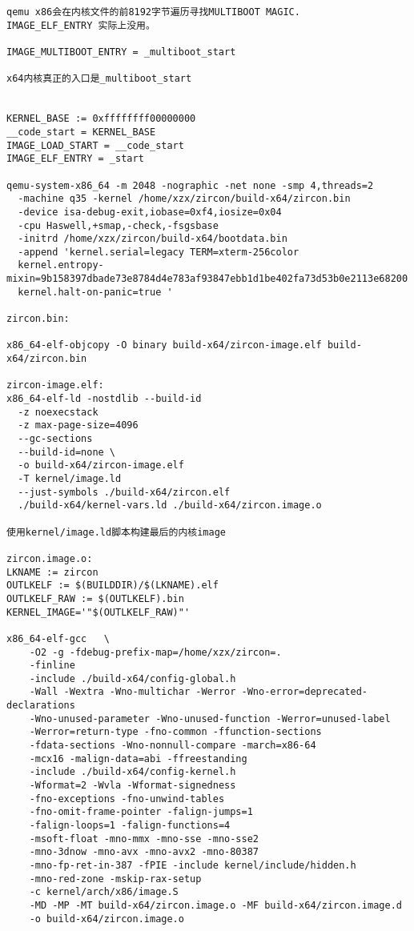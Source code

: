 \begin{verbatim}
qemu x86会在内核文件的前8192字节遍历寻找MULTIBOOT MAGIC.  
IMAGE_ELF_ENTRY 实际上没用。

IMAGE_MULTIBOOT_ENTRY = _multiboot_start

x64内核真正的入口是_multiboot_start


KERNEL_BASE := 0xffffffff00000000
__code_start = KERNEL_BASE
IMAGE_LOAD_START = __code_start
IMAGE_ELF_ENTRY = _start

qemu-system-x86_64 -m 2048 -nographic -net none -smp 4,threads=2 
  -machine q35 -kernel /home/xzx/zircon/build-x64/zircon.bin 
  -device isa-debug-exit,iobase=0xf4,iosize=0x04 
  -cpu Haswell,+smap,-check,-fsgsbase 
  -initrd /home/xzx/zircon/build-x64/bootdata.bin 
  -append 'kernel.serial=legacy TERM=xterm-256color 
  kernel.entropy-mixin=9b158397dbade73e8784d4e783af93847ebb1d1be402fa73d53b0e2113e68200 
  kernel.halt-on-panic=true '

zircon.bin:

x86_64-elf-objcopy -O binary build-x64/zircon-image.elf build-x64/zircon.bin

zircon-image.elf:
x86_64-elf-ld -nostdlib --build-id 
  -z noexecstack 
  -z max-page-size=4096 
  --gc-sections 
  --build-id=none \
  -o build-x64/zircon-image.elf 
  -T kernel/image.ld 
  --just-symbols ./build-x64/zircon.elf
  ./build-x64/kernel-vars.ld ./build-x64/zircon.image.o

使用kernel/image.ld脚本构建最后的内核image

zircon.image.o:
LKNAME := zircon
OUTLKELF := $(BUILDDIR)/$(LKNAME).elf
OUTLKELF_RAW := $(OUTLKELF).bin
KERNEL_IMAGE='"$(OUTLKELF_RAW)"'

x86_64-elf-gcc   \
    -O2 -g -fdebug-prefix-map=/home/xzx/zircon=. 
    -finline 
    -include ./build-x64/config-global.h 
    -Wall -Wextra -Wno-multichar -Werror -Wno-error=deprecated-declarations 
    -Wno-unused-parameter -Wno-unused-function -Werror=unused-label 
    -Werror=return-type -fno-common -ffunction-sections 
    -fdata-sections -Wno-nonnull-compare -march=x86-64 
    -mcx16 -malign-data=abi -ffreestanding 
    -include ./build-x64/config-kernel.h 
    -Wformat=2 -Wvla -Wformat-signedness 
    -fno-exceptions -fno-unwind-tables 
    -fno-omit-frame-pointer -falign-jumps=1 
    -falign-loops=1 -falign-functions=4 
    -msoft-float -mno-mmx -mno-sse -mno-sse2 
    -mno-3dnow -mno-avx -mno-avx2 -mno-80387 
    -mno-fp-ret-in-387 -fPIE -include kernel/include/hidden.h 
    -mno-red-zone -mskip-rax-setup 
    -c kernel/arch/x86/image.S 
    -MD -MP -MT build-x64/zircon.image.o -MF build-x64/zircon.image.d 
    -o build-x64/zircon.image.o



\end{verbatim}
